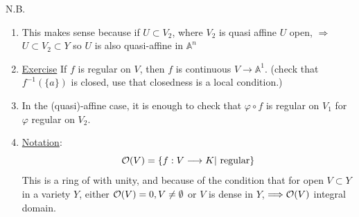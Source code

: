 \documentclass[11pt]{article}
\newcommand{\affn}{\mathbb A}
\newcommand{\calo}{{\cal O}}
\newcommand{\Lrta}{\Longrightarrow}
\newcommand{\lrta}{\longrightarrow}
\begin{document}
N.B. \begin{enumerate}
\item This makes sense because if $U\subset V_2$, where $V_2$ is quasi affine $U$ open, $\Lrta$ $U\subset V_2\subset Y$ so $U$ is also quasi-affine in $\affn^n$
\item \underline{Exercise} If $f$ is regular on $V$, then $f$ is continuous $V\lrta \affn^1$. (check that $f^{-1}(\{a\})$ is closed, use that closedness is a local condition.)
\item In the (quasi)-affine case, it is enough to check that $\varphi\circ f$ is regular on $V_1$ for $\varphi$ regular on $V_2$.
\item \underline{Notation}:
$$\calo(V)=\{f:V\lrta K|\text{ regular}\}$$
This is a ring of with unity, and because of the condition that for open $V\subset Y$ in a variety $Y$, either $\calo(V)=0,V\neq \emptyset$ or $V$ is dense in $Y$, $\Lrta \calo(V)$ integral domain. 
\end{enumerate}
\end{document}
